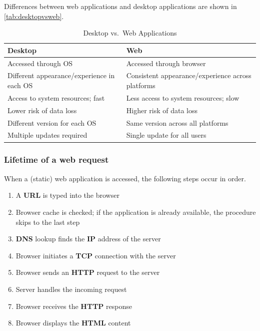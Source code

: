 Differences between web applications and desktop applications are shown in \autoref{tab:desktopvsweb}.

\begin{table}[ht]
    \centering
    \begin{tabular}{@{}ll@{}}
    \toprule
    \textbf{Desktop} & \textbf{Web} \\ \midrule
    Accessed through OS & Accessed through browser \\
    Different appearance/experience in each OS & Consistent appearance/experience across platforms \\
    Access to system resources; fast & Less access to system resources; slow \\
    Lower risk of data loss & Higher risk of data loss \\
    Different version for each OS & Same version across all platforms \\
    Multiple updates required & Single update for all users \\ \bottomrule
    \end{tabular}
    \caption{Desktop vs.\ Web Applications}
    \label{tab:desktopvsweb}
    \end{table}

    \subsubsection{Lifetime of a web request}
When a (static) web application is accessed, the following steps occur in order.

\begin{enumerate}
    \item A \textbf{URL} is typed into the browser
    \item Browser cache is checked; if the application is already available, the procedure skips to the last step
    \item \textbf{DNS} lookup finds the \textbf{IP} address of the server
    \item Browser initiates a \textbf{TCP} connection with the server
    \item Browser sends an \textbf{HTTP} request to the server
    \item Server handles the incoming request 
    \item Browser receives the \textbf{HTTP} response
    \item Browser displays the \textbf{HTML} content 
\end{enumerate}

